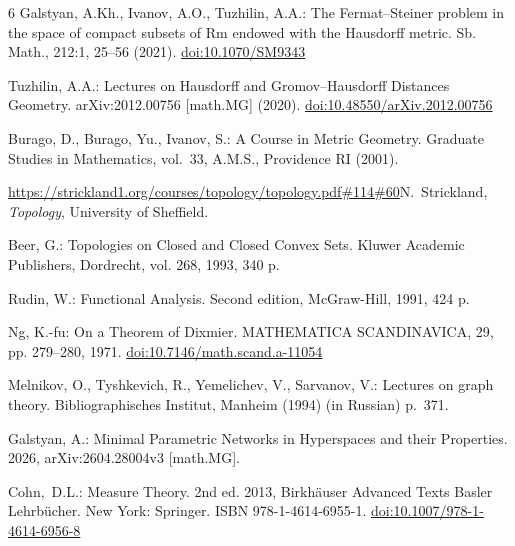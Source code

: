 \documentclass{svproc}
\begin{document}
\begin{thebibliography}{6}
 Galstyan, A.Kh., Ivanov, A.O., Tuzhilin, A.A.: The Fermat--Steiner problem in the space of compact subsets of Rm endowed with the Hausdorff metric. Sb. Math., 212:1, 25--56 (2021).
\url{doi:10.1070/SM9343}

 Tuzhilin, A.A.: Lectures on Hausdorff and Gromov--Hausdorff Distances Geometry. arXiv:2012.00756 [math.MG] (2020).
\url{doi:10.48550/arXiv.2012.00756}

 Burago, D., Burago, Yu., Ivanov, S.: A Course in Metric Geometry. Graduate Studies in Mathematics, vol.~33, A.M.S., Providence RI (2001).

 \url{https://strickland1.org/courses/topology/topology.pdf#114#60}{N.~Strickland, \textit{Topology}, University of Sheffield.} 

 Beer, G.: Topologies on Closed and Closed Convex Sets. Kluwer Academic Publishers, Dordrecht, vol. 268, 1993, 340 p.

 Rudin, W.: Functional Analysis. Second edition, McGraw-Hill, 1991, 424 p.

 Ng, K.-fu: On a Theorem of Dixmier. MATHEMATICA SCANDINAVICA, 29, pp. 279--280, 1971. 
\url{doi:10.7146/math.scand.a-11054}

 Melnikov, O., Tyshkevich, R., Yemelichev, V., Sarvanov, V.:  Lectures on graph theory. Bibliographisches Institut, Manheim (1994) (in Russian) p.~371.

 Galstyan, A.: Minimal Parametric Networks in Hyperspaces and their Properties. 2026, arXiv:2604.28004v3 [math.MG].

 Cohn,~D.L.: Measure Theory. 2nd ed. 2013, Birkh\"{a}user Advanced Texts Basler Lehrb\"{u}cher. New York: Springer. ISBN 978-1-4614-6955-1. 
\url{doi:10.1007/978-1-4614-6956-8}

\end{thebibliography}
\end{document}
